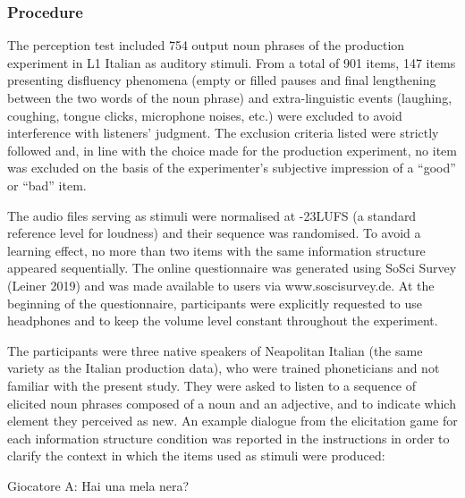 \subsubsection[Procedure]{Procedure}
\hypertarget{Toc191305901}{}\begin{styleStandard}
The perception test included 754 output noun phrases of the production experiment in L1 Italian as auditory stimuli. From a total of 901 items, 147 items presenting disfluency phenomena (empty or filled pauses and final lengthening between the two words of the noun phrase) and extra-linguistic events (laughing, coughing, tongue clicks, microphone noises, etc.) were excluded to avoid interference with listeners’ judgment. The exclusion criteria listed were strictly followed and, in line with the choice made for the production experiment, no item was excluded on the basis of the experimenter’s subjective impression of a “good” or “bad” item.
\end{styleStandard}

\begin{styleStandard}
The audio files serving as stimuli were normalised at -23LUFS (a standard reference level for loudness) and their sequence was randomised. To avoid a learning effect, no more than two items with the same information structure appeared sequentially. The online questionnaire was generated using SoSci Survey (Leiner 2019) and was made available to users via www.soscisurvey.de. At the beginning of the questionnaire, participants were explicitly requested to use headphones and to keep the volume level constant throughout the experiment.
\end{styleStandard}

\begin{styleStandard}
The participants were three native speakers of Neapolitan Italian (the same variety as the Italian production data), who were trained phoneticians and not familiar with the present study. They were asked to listen to a sequence of elicited noun phrases composed of a noun and an adjective, and to indicate which element they perceived as new. An example dialogue from the elicitation game for each information structure condition was reported in the instructions in order to clarify the context in which the items used as stimuli were produced:
\end{styleStandard}

\begin{styleTextbody}
Giocatore A: Hai una mela nera?
\end{styleTextbody}

